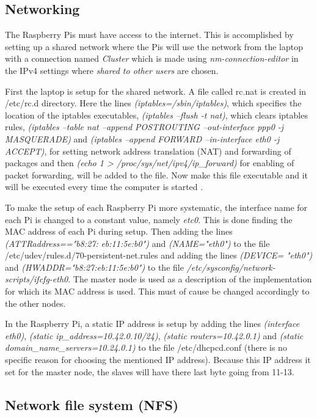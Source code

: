 \documentclass[../Head/Report.tex]{subfiles}
\begin{document}
\subsection{Networking}
The Raspberry Pis must have access to the internet. This is accomplished by setting up a shared network where the Pis will use the network from the laptop with a connection named \textit{Cluster} which is made using \textit{nm-connection-editor} in the IPv4 settings where \textit{shared to other users} are chosen. 

First the laptop is setup for the shared network. A file called rc.nat is created in /etc/rc.d directory. Here the lines \textit{(iptables=/sbin/iptables)}, which specifies the location of the iptables executables, \textit{(iptables --flush -t nat)}, which clears iptables rules, \textit{(iptables --table nat --append POSTROUTING --out-interface ppp0 -j MASQUERADE)} and \textit{(iptables --append FORWARD --in-interface eth0 -j ACCEPT)}, for setting network address translation (NAT) and forwarding of packages and then \textit{(echo 1 > /proc/sys/net/ipv4/ip\_forward)} for enabling of packet forwarding, will be added to the file. Now make this file executable and it will be executed every time the computer is started \cite{Networking}.

To make the setup of each Raspberry Pi more systematic, the interface name for each Pi is changed to a constant value, namely \textit{etc0}. This is done finding the MAC address of each Pi during setup. Then adding the lines \textit{(ATTR{address}=="b8:27:} \textit{eb:11:5e:b0")} and \textit{(NAME="eth0")} to the file /etc/udev/rules.d/70-persistent-net.rules and adding the lines \textit{(DEVICE=} \textit{"eth0")} and \textit{(HWADDR="b8:27:eb:11:5e:b0")} to the file  \textit{/etc/sysconfig/network-scripts/ifcfg-eth0}. The master node is used as a description of the implementation for which its MAC address is used. This must of cause be changed accordingly to the other nodes.\cite{Interface_Name}     

In the Raspberry Pi, a static IP address is setup by adding the lines \textit{(interface eth0)}, \textit{(static ip\_address=10.42.0.10/24)}, \textit{(static routers=10.42.0.1)} and \textit{(static domain\_name\_servers=10.24.0.1)} to the file /etc/dhcpcd.conf (there is no specific reason for choosing the mentioned IP address). Because this IP address it set for the master node, the slaves will have there last byte going from 11-13.

\subsection{Network file system (NFS)} 
\end{document}
